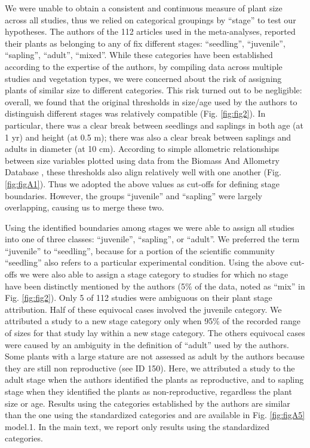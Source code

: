 \documentclass[a4paper,11pt]{article}
\begin{document}
We were unable to obtain a consistent and continuous measure of plant size across all studies, thus we relied on categorical groupings by ``stage'' to test our hypotheses. The authors of the 112 articles used in the meta-analyses, reported their plants as belonging to any of fix different stages: ``seedling'', ``juvenile'', ``sapling'', ``adult'', ``mixed''. While these categories have been established according to the expertise of the authors, by compiling data across multiple studies and vegetation types, we were concerned about the risk of assigning plants of similar size to different categories. This risk turned out to be negligible: overall, we found that the original thresholds in size/age used by the authors to distinguish different stages was relatively compatible (Fig. \ref{fig:fig2}). In particular, there was a clear break between seedlings and saplings in both age (at 1 yr) and height (at 0.5 m); there was also a clear break between saplings and adults in diameter (at 10 cm). According to simple allometric relationships between size variables plotted using data from the Biomass And Allometry Database \citep{Falster:2015}, these thresholds also align relatively well with one another (Fig. \ref{fig:figA1}). Thus we adopted the above values as cut-offs for defining stage boundaries. However, the groups ``juvenile'' and ``sapling'' were largely overlapping, causing us to merge these two.

Using the identified boundaries among stages we were able to assign all studies into one of three classes: ``juvenile'', ``sapling'', or ``adult''.  We preferred the term ``juvenile'' to ``seedling'', because for a portion of the scientific community ``seedling'' also refers to a particular experimental condition. Using the above cut-offs we were also able to assign a stage category to studies for which no stage have been distinctly mentioned by the authors (5\% of the data, noted as ``mix'' in Fig. \ref{fig:fig2}). Only 5 of 112 studies were ambiguous on their plant stage attribution. Half of these equivocal cases involved the juvenile category. We attributed a study to a new stage category only when 95\% of the recorded range of sizes for that study lay within a new stage category. The others equivocal cases were caused by an ambiguity in the definition of ``adult'' used by the authors. Some plants with a large stature are not assessed as adult by the authors because they are still non reproductive (see ID 150). Here, we attributed a study to the adult stage when the authors identified the plants as reproductive, and to sapling stage when they identified the plants as non-reproductive, regardless the plant size or age. Results using the categories established by the authors are similar than the one using the standardized categories and are available in Fig. \ref{fig:figA5} model.1. In the main text, we report only results using the standardized categories.
\end{document}
